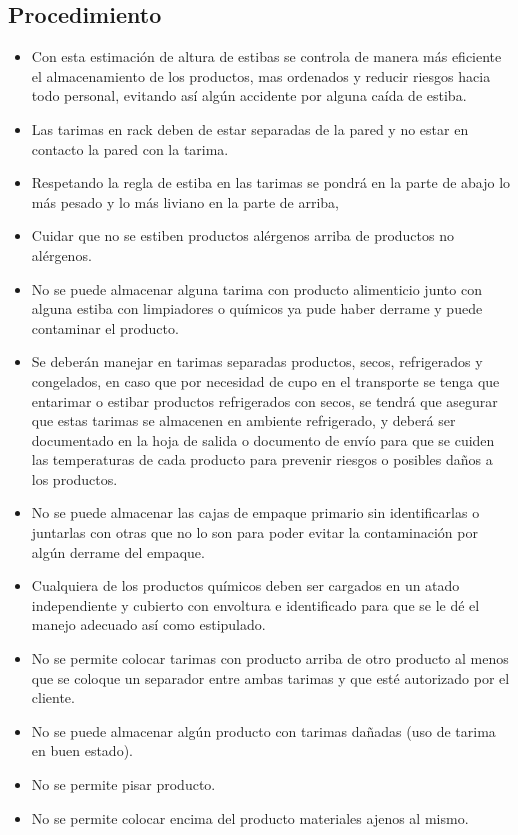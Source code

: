 \subsection{Procedimiento}

\begin{itemize}
	\item Con esta estimación de altura de estibas se controla de manera más eficiente el almacenamiento de los productos, mas ordenados y reducir riesgos hacia todo personal, evitando así algún accidente por alguna caída de estiba.
	\item Las tarimas en rack deben de estar separadas de la pared y no estar en contacto la pared con la tarima.
	\item Respetando la regla de estiba en las tarimas se pondrá en la parte de abajo lo más pesado y lo más liviano en la parte de arriba,
	\item Cuidar que no se estiben productos alérgenos arriba de productos no alérgenos.
	\item No se puede almacenar alguna tarima con producto alimenticio junto con alguna estiba con limpiadores o químicos ya pude haber derrame y puede contaminar el producto.
	\item Se deberán manejar en tarimas separadas productos, secos, refrigerados y congelados, en caso que por necesidad de cupo en el transporte se tenga que entarimar o estibar productos refrigerados con secos, se tendrá que asegurar que estas tarimas se almacenen en ambiente refrigerado, y deberá ser documentado en la hoja de salida o documento de envío para que se cuiden las temperaturas de cada producto para prevenir riesgos o posibles daños a los productos.
	\item No se puede almacenar las cajas de empaque primario sin identificarlas o juntarlas con otras que no lo son para poder evitar la contaminación por algún derrame del empaque.
	\item Cualquiera de los productos químicos deben ser cargados en un atado independiente y cubierto con envoltura e identificado para que se le dé el manejo adecuado así como estipulado.
	\item No se permite colocar tarimas con producto arriba de otro producto al menos que se coloque un separador entre ambas tarimas y que esté autorizado por el cliente.
	\item No se puede almacenar algún producto con tarimas dañadas (uso de tarima en buen estado).
	\item No se permite pisar producto.
	\item No se permite colocar encima del producto materiales ajenos al mismo.
\end{itemize}


